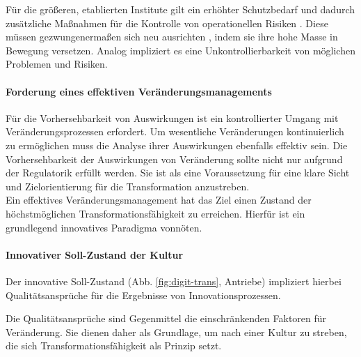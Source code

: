 Für die größeren, etablierten Institute gilt ein erhöhter Schutzbedarf \cite{recht/Bornemann2018} und dadurch zusätzliche Maßnahmen für die Kontrolle von operationellen Risiken \cite{MaRisk:2017, BAIT:2018}. Diese müssen gezwungenermaßen sich neu ausrichten \citet{Bussmann2006, Gupta:2017}, indem sie ihre hohe Masse in Bewegung versetzen. Analog impliziert es eine Unkontrollierbarkeit von möglichen Problemen und Risiken.

\paragraph{Forderung eines effektiven Veränderungsmanagements}
Für die Vorhersehbarkeit von Auswirkungen ist ein kontrollierter Umgang mit Veränderungsprozessen erfordert. Um wesentliche Veränderungen kontinuierlich zu ermöglichen muss die Analyse ihrer Auswirkungen \cite{MaRisk:2017} ebenfalls effektiv sein. Die Vorhersehbarkeit der Auswirkungen von Veränderung sollte nicht nur aufgrund der Regulatorik erfüllt werden. Sie ist als eine Voraussetzung für eine klare Sicht und Zielorientierung für die Transformation anzustreben.
\medskip
\\
Ein effektives Veränderungsmanagement hat das Ziel einen Zustand der höchstmöglichen Transformationsfähigkeit zu erreichen. Hierfür ist ein grundlegend innovatives Paradigma vonnöten. 

\paragraph{Innovativer Soll-Zustand der Kultur}
Der innovative Soll-Zustand (Abb. \ref{fig:digit-trans}, Antriebe) impliziert hierbei Qualitätsansprüche für die Ergebnisse von Innovationsprozessen.

Die Qualitätsansprüche sind Gegenmittel die einschränkenden Faktoren für Veränderung.
Sie dienen daher als Grundlage, um nach einer Kultur zu streben, die sich Transformationsfähigkeit als Prinzip setzt.

